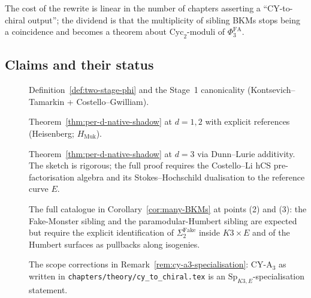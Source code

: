 The cost of the rewrite is linear in the number of chapters asserting a
``CY-to-chiral output''; the dividend is that the multiplicity of
sibling BKMs stops being a coincidence and becomes a theorem about
$\mathrm{Cyc}_2$-moduli of $\Phi^{\mathrm{FA}}_3$.

\subsection{Claims and their status}

\begin{description}
\item[\ClaimStatusTheorem] Definition~\ref{def:two-stage-phi} and the
Stage~1 canonicality (Kontsevich--Tamarkin + Costello--Gwilliam).

\item[\ClaimStatusTheorem] Theorem~\ref{thm:per-d-native-shadow} at
$d=1,2$ with explicit references (Heisenberg; $H_{\mathrm{Muk}}$).

\item[\ClaimStatusDerivation] Theorem~\ref{thm:per-d-native-shadow} at
$d=3$ via Dunn--Lurie additivity. The sketch is rigorous; the full
proof requires the Costello--Li hCS pre-factorisation algebra and
its Stokes--Hochschild dualisation to the reference curve $E$.

\item[\ClaimStatusConjectured] The full catalogue in
Corollary~\ref{cor:many-BKMs} at points (2) and (3): the Fake-Monster
sibling and the paramodular-Humbert sibling are expected but require
the explicit identification of $\Sigma_2^{\mathrm{Fake}}$ inside
$K3\times E$ and of the Humbert surfaces as pullbacks along isogenies.

\item[\ClaimStatusDerivation] The scope corrections in
Remark~\ref{rem:cy-a3-specialisation}: CY-A$_3$ as written in
\texttt{chapters/theory/cy\_to\_chiral.tex} is an
$\mathrm{Sp}_{K3,E}$-specialisation statement.
\end{description}
